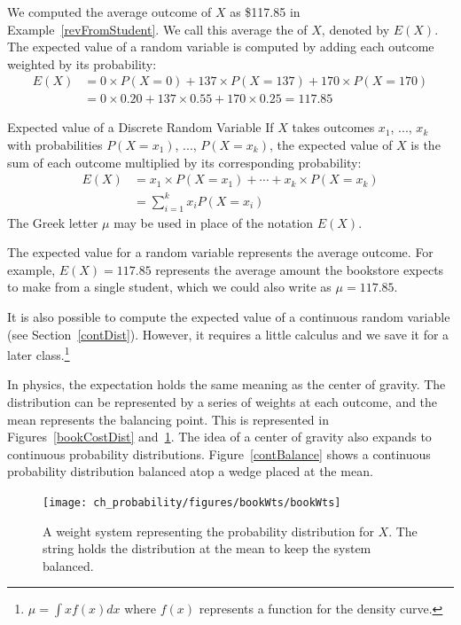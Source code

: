 We computed the average outcome of $X$ as \$117.85 in Example~\ref{revFromStudent}.
We call this average the  of $X$, denoted by $E(X)$.
The expected value of a random variable is computed by adding each outcome weighted by its probability:
\begin{align*}
E(X) &= 0 \times  P(X=0) + 137 \times  P(X=137) + 170 \times  P(X=170) \\
	&= 0 \times  0.20 + 137 \times  0.55 + 170 \times  0.25 = 117.85
\end{align*}

\begin{onebox}{Expected value of a Discrete Random Variable}
If $X$ takes outcomes $x_1$, ..., $x_k$ with probabilities $P(X=x_1)$, ..., $P(X=x_k)$, the expected value of $X$ is the sum of each outcome multiplied by its corresponding probability:
\begin{align*}
E(X)
  &= x_1 \times P(X = x_1) + \cdots + x_k\times P(X = x_k) \\
  &= \sum_{i = 1}^{k} x_i P(X = x_i)
\end{align*}
The Greek letter $\mu$ may be used in place of the notation $E(X)$.
\end{onebox}

The expected value for a random variable represents the average outcome. For example, $E(X)=117.85$ represents the average amount the bookstore expects to make from a single student, which we could also write as $\mu=117.85$.

It is also possible to compute the expected value of a continuous random variable (see Section~\ref{contDist}). However, it requires a little calculus and we save it for a later class.\footnote{$\mu = \int xf(x)dx$ where $f(x)$ represents a function for the density curve.}

In physics, the expectation holds the same meaning as the center of gravity. The distribution can be represented by a series of weights at each outcome, and the mean represents the balancing point. This is represented in Figures~\ref{bookCostDist} and~\ref{bookWts}. The idea of a center of gravity also expands to continuous probability distributions. Figure~\ref{contBalance} shows a continuous probability distribution balanced atop a wedge placed at the mean.

\begin{figure}
\centering
\texttt{[image: ch\_probability/figures/bookWts/bookWts]}
\caption{A weight system representing the probability distribution for $X$. The string holds the distribution at the mean to keep the system balanced.}
\label{bookWts}
\end{figure}

